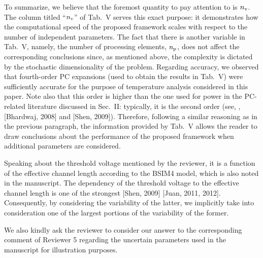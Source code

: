 \begin{authors}
To summarize, we believe that the foremost quantity to pay attention to is ${n_\text{v}}$.
The column titled ``${n_\text{v}}$'' of Tab.~V serves this exact purpose: it demonstrates how the computational speed of the proposed framework scales with respect to the number of independent parameters.
The fact that there is another variable in Tab.~V, namely, the number of processing elements, ${n_\text{p}}$, does not affect the corresponding conclusions since, as mentioned above, the complexity is dictated by the stochastic dimensionality of the problem.
Regarding accuracy, we observed that fourth-order PC expansions (used to obtain the results in Tab.~V) were sufficiently accurate for the purpose of temperature analysis considered in this paper.
Note also that this order is higher than the one used for power in the PC-related literature discussed in Sec.~II: typically, it is the second order (see, \eg, [Bhardwaj, 2008] and [Shen, 2009]).
Therefore, following a similar reasoning as in the previous paragraph, the information provided by Tab.~V allows the reader to draw conclusions about the performance of the proposed framework when additional parameters are considered.

Speaking about the threshold voltage mentioned by the reviewer, it is a function of the effective channel length according to the BSIM4 model, which is also noted in the manuscript.
The dependency of the threshold voltage to the effective channel length is one of the strongest [Shen, 2009] [Juan, 2011, 2012].
Consequently, by considering the variability of the latter, we implicitly take into consideration one of the largest portions of the variability of the former.

We also kindly ask the reviewer to consider our answer to the corresponding comment of Reviewer 5 regarding the uncertain parameters used in the manuscript for illustration purposes.

\end{authors}
